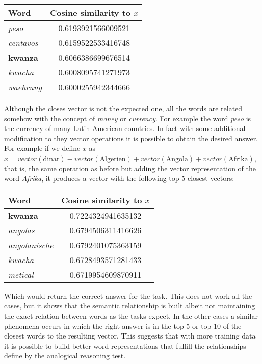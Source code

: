 \begin{center}
\small
\begin{tabular}{|l|c|}
 \hline
 Word             &  Cosine similarity to $x$  \\
\hline
 \textit{peso}           &      0.6193921566009521  \\
 \textit{centavos}       &      0.6159522533416748  \\
 \textbf{kwanza}         &      0.6066386699676514  \\
 \textit{kwacha}         &      0.6008095741271973  \\
 \textit{waehrung}       &      0.6000255942344666  \\
\hline
\end{tabular}
\end{center}


Although the closes vector is not the expected one, all the words are related
somehow with the concept of \textit{money} or \textit{currency}.  For example
the word \textit{peso} is the currency of many Latin American countries. In
fact with some additional modification  to they vector operations it is
possible to obtain the desired answer. For example if we define $x$ as  $x = vector(\text{dinar}) -
vector(\text{Algerien}) + vector(\text{Angola})  + vector(\text{Afrika}) $,
that is, the same operation as before but adding the vector representation of
the word \textit{Afrika}, it produces a vector with the following top-5 closest
vectors:


\begin{center}
\small
\begin{tabular}{|l|c|}
 \hline
 Word                 &  Cosine similarity to $x$  \\
\hline
\textbf{kwanza}        &        0.7224324941635132  \\
 \emph{angolas}       &        0.6794506311416626  \\
 \emph{angolanische}  &        0.6792401075363159  \\
 \emph{kwacha}        &        0.6728493571281433  \\
 \emph{metical}       &        0.6719954609870911  \\
\hline
\end{tabular}
\end{center}

Which would return the correct answer for the task. This does not work all
the cases, but it shows that the semantic relationship is built albeit not
maintaining the exact relation between words as the tasks expect. In the
other cases  a similar phenomena occurs in which the right answer is in the
top-5 or top-10 of the closest words to the resulting vector. This suggests 
that with more training data it is possible to build better word
representations  that fulfill the relationships define  by the analogical
reasoning test.



